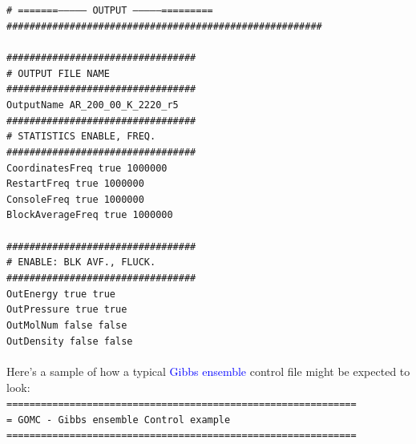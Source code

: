 \texttt{\#  =======--------------- OUTPUT --------------=========}\\
\texttt{\#\#\#\#\#\#\#\#\#\#\#\#\#\#\#\#\#\#\#\#\#\#\#\#\#\#\#\#\#\#\#\#\#\#\#\#\#\#\#\#\#\#\#\#\#\#\#\#\#\#\#\#\#\#\#}\\
\texttt{}\\
\texttt{\#\#\#\#\#\#\#\#\#\#\#\#\#\#\#\#\#\#\#\#\#\#\#\#\#\#\#\#\#\#\#\#\#}\\
\texttt{\# OUTPUT FILE NAME}\\
\texttt{\#\#\#\#\#\#\#\#\#\#\#\#\#\#\#\#\#\#\#\#\#\#\#\#\#\#\#\#\#\#\#\#\#}\\
\texttt{OutputName  AR\_200\_00\_K\_2220\_r5}\\
\newpage
\texttt{\#\#\#\#\#\#\#\#\#\#\#\#\#\#\#\#\#\#\#\#\#\#\#\#\#\#\#\#\#\#\#\#\#}\\
\texttt{\# STATISTICS	ENABLE,	FREQ.}\\
\texttt{\#\#\#\#\#\#\#\#\#\#\#\#\#\#\#\#\#\#\#\#\#\#\#\#\#\#\#\#\#\#\#\#\#}\\
\texttt{CoordinatesFreq      true   1000000}\\
\texttt{RestartFreq  	         true   1000000}\\
\texttt{ConsoleFreq            true   1000000}\\
\texttt{BlockAverageFreq   true   1000000}\\
\texttt{}\\
\texttt{\#\#\#\#\#\#\#\#\#\#\#\#\#\#\#\#\#\#\#\#\#\#\#\#\#\#\#\#\#\#\#\#\#}\\
\texttt{\# ENABLE: BLK AVF., FLUCK.}\\
\texttt{\#\#\#\#\#\#\#\#\#\#\#\#\#\#\#\#\#\#\#\#\#\#\#\#\#\#\#\#\#\#\#\#\#}\\
\texttt{OutEnergy         true    true}\\
\texttt{OutPressure 	   true    true}\\
\texttt{OutMolNum       false   false}\\ 
\texttt{OutDensity         false   false}\\
\texttt{}\\
\newpage
Here's a sample of how a typical \textcolor{blue}{Gibbs ensemble} control file might be expected to look:\\
\texttt{=============================================================}\\
\texttt{=       GOMC - Gibbs ensemble Control example     }\\
\texttt{=============================================================}\\
